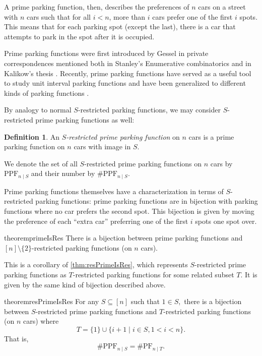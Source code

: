 \documentclass[12 pt]{amsart}
\theoremstyle{definition} %
\newtheorem{definition}[theorem]{Definition}
\theoremstyle{remark} %
\begin{document}
A prime parking function, then, describes the preferences of $n$ cars on a street with $n$ cars such that for all $i < n$, more than $i$ cars prefer one of the first $i$ spots. This means that for each parking spot (except the last), there is a car that attempts to park in the spot after it is occupied.

Prime parking functions were first introduced by Gessel in private correspondences mentioned both in Stanley’s Enumerative combinatorics \cite{stanley-fomin-1999} and in Kalikow’s thesis \cite{kalikow-1999}. Recently, prime parking functions have served as a useful tool to study unit interval parking functions \cite{meyles-2023} and have been generalized to different kinds of parking functions \cite{armon-2024}.

By analogy to normal $S$-restricted parking functions, we may consider $S$-restricted prime parking functions as well:

\begin{definition}
    An \emph{$S$-restricted prime parking function} on $n$ cars is a prime parking function on $n$ cars with image in $S$.

    We denote the set of all $S$-restricted prime parking functions on $n$ cars by $\mathrm{PPF}_{n \mid S}$ and their number by $\# \mathrm{P P F}_{n \mid S}$.
\end{definition}

Prime parking functions themselves have a characterization in terms of $S$-restricted parking functions: prime parking functions are in bijection with parking functions where no car prefers the second spot. This bijection is given by moving the preference of each ``extra car'' preferring one of the first $i$ spots one spot over.

\begin{restatable}{theorem}{primeIsRes}
    \label{thm:primeIsRes}
	There is a bijection between prime parking functions and $[n] \setminus \{ 2 \}$-restricted parking functions (on $n$ cars). 
\end{restatable}

This is a corollary of \cref{thm:resPrimeIsRes}, which represents $S$-restricted prime parking functions as $T$-restricted parking functions for some related subset $T$. It is given by the same kind of bijection described above.

\begin{restatable}{theorem}{resPrimeIsRes}
    \label{thm:resPrimeIsRes}
	For any $S\subseteq [n]$ such that $1\in S,$  there is a bijection between $S$-restricted prime parking functions and $T$-restricted parking functions (on $n$ cars) where
	\[
		T = \{ 1 \} \cup \{ i + 1 \mid i \in S, 1 < i < n \}.
	\]
	That is,
	\[
		\# \mathrm{PPF}_{n \mid S} = \# \mathrm{PF}_{n \mid T}.
	\]
\end{restatable}
\end{document}
